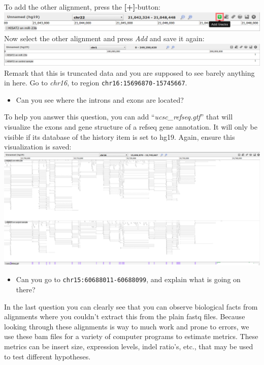 \documentclass[11pt,a4paper]{article}
\begin{document}
To add the other alignment, press the \textbf{[+]}-button:\\
\includegraphics[width=\textwidth]{figures/alignment_06.png}\\
Now select the other alignment and press \textit{Add} and save it again:\\
\includegraphics[width=\textwidth]{figures/alignment_07.png}\\
Remark that this is truncated data and you are supposed to see barely anything in here. Go to \textit{chr16}, to region \verb|chr16:15696870-15745667|.
\begin{itemize}
	\item Can you see where the introns and exons are located?
\end{itemize}
To help you answer this question, you can add ``\textit{ucsc\_refseq.gtf}'' that will visualize the exons and gene structure of a refseq gene annotation. It will only be visible if its database of the history item is set to hg19. Again, ensure this visualization is saved:\\
\includegraphics[width=\textwidth]{figures/alignment_08.png}\\
\begin{itemize}
	\item Can you go to \verb|chr15:60688011-60688099|, and explain what is going on there?
\end{itemize}
In the last question you can clearly see that you can observe biological facts from alignments where you couldn't extract this from the plain fastq files. Because looking through these alignments is way to much work and prone to errors, we use these bam files for a variety of computer programs to estimate metrics. These metrics can be insert size, expression levels, indel ratio's, etc., that may be used to test different hypotheses.
\end{document}
